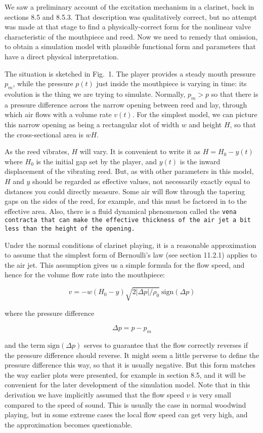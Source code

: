   We saw a preliminary account of the excitation mechanism in a clarinet, back 
  in sections 8.5 and 8.5.3. That description was qualitatively correct, but no 
  attempt was made at that stage to find a physically-correct form for the 
  nonlinear valve characteristic of the mouthpiece and reed. Now we need to 
  remedy that omission, to obtain a simulation model with plausible functional 
  form and parameters that have a direct physical interpretation. 

  The situation is sketched in Fig.\ 1. The player provides a steady mouth 
  pressure $p_m$, while the pressure $p(t)$ just inside the mouthpiece is 
  varying in time: its evolution is the thing we are trying to simulate. 
  Normally, $p_m > p$ so that there is a pressure difference across the narrow 
  opening between reed and lay, through which air flows with a volume rate 
  $v(t)$. For the simplest model, we can picture this narrow opening as being a 
  rectangular slot of width $w$ and height $H$, so that the cross-sectional 
  area is $wH$. 

  As the reed vibrates, $H$ will vary. It is convenient to write it as 
  $H=H_0-y(t)$ where $H_0$ is the initial gap set by the player, and $y(t)$ is 
  the inward displacement of the vibrating reed. But, as with other parameters 
  in this model, $H$ and $y$ should be regarded as effective values, not 
  necessarily exactly equal to distances you could directly measure. Some air 
  will flow through the tapering gaps on the sides of the reed, for example, 
  and this must be factored in to the effective area. Also, there is a fluid 
  dynamical phenomenon called the \tt{}vena contracta\rm{} that can make the 
  effective thickness of the air jet a bit less than the height of the opening. 

  Under the normal conditions of clarinet playing, it is a reasonable 
  approximation to assume that the simplest form of Bernoulli's law (see 
  section 11.2.1) applies to the air jet. This assumption gives us a simple 
  formula for the flow speed, and hence for the volume flow rate into the 
  mouthpiece: 

  $$v=-w(H_0-y) \sqrt{2 |\Delta p|/\rho_0} \mathrm{~sign} (\Delta p) \tag{1}$$ 

  where the pressure difference 

  $$\Delta p = p-p_m \tag{2}$$ 

  and the term $\mathrm{sign}(\Delta p)$ serves to guarantee that the flow 
  correctly reverses if the pressure difference should reverse. It might seem a 
  little perverse to define the pressure difference this way, so that it is 
  usually negative. But this form matches the way earlier plots were presented, 
  for example in section 8.5, and it will be convenient for the later 
  development of the simulation model. Note that in this derivation we have 
  implicitly assumed that the flow speed $v$ is very small compared to the 
  speed of sound. This is usually the case in normal woodwind playing, but in 
  some extreme cases the local flow speed can get very high, and the 
  approximation becomes questionable. 

